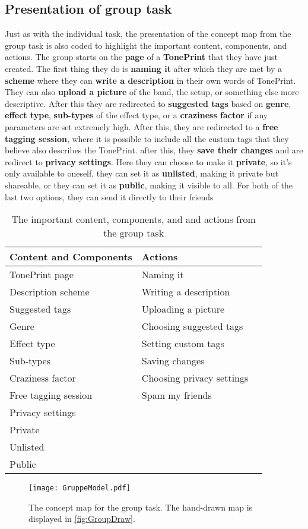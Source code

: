 \subsection*{Presentation of group task}
\label{GroupTaskPresentation}
Just as with the individual task, the presentation of the concept map from the group task is also coded to highlight the important content, components, and actions. The group starts on the \textbf{page} of a \textbf{TonePrint} that they have just created. The first thing they do is \textbf{naming it} after which they are met by a \textbf{scheme} where they can \textbf{write a description} in their own words of TonePrint. They can also \textbf{upload a picture} of the band, the setup, or something else more descriptive. After this they are redirected to \textbf{suggested tags} based on \textbf{genre}, \textbf{effect type}, \textbf{sub-types} of the effect type, or a \textbf{craziness factor} if any parameters are set extremely high. After this, they are redirected to a \textbf{free tagging session}, where it is possible to include all the custom tags that they believe also describes the TonePrint. after this, they \textbf{save their changes} and are redirect to \textbf{privacy settings}. Here they can choose to make it \textbf{private}, so it's only available to oneself, they can set it as \textbf{unlisted}, making it private but shareable, or they can set it as \textbf{public}, making it visible to all. For both of the last two options, they can send it directly to their friends
%
\begin{table}[H]
\begin{minipage}[b]{\linewidth}\centering
	\begin{tabular} {|l|l|l|} \hline
		\rowcolor{xGray25} \textbf{Content and Components} & \textbf{Actions} \\  \hline
		TonePrint page & Naming it \\
		Description scheme & Writing a description \\
		Suggested tags & Uploading a picture \\
		Genre & Choosing suggested tags \\
		Effect type & Setting custom tags \\
		Sub-types & Saving changes \\
		Craziness factor & Choosing privacy settings \\
		Free tagging session & Spam my friends \\
		Privacy settings & \\
		Private & \\
		Unlisted & \\
		Public & \\ \hline
	\end{tabular}
	\caption{The important content, components, and and actions from the group task}
	\label{tab:GroupContentActions}
\end{minipage}
\end{table}
%
\newpage
%
\begin{figure}[H]
	\centering
	\texttt{[image: GruppeModel.pdf]}
	\caption{The concept map for the group task. The hand-drawn map is displayed in \autoref{fig:GroupDraw}.}
	\label{fig:GroupConceptMap}
\end{figure}
%


